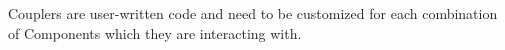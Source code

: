 %


Couplers are user-written code and need to be
customized for each combination of Components
which they are interacting with.

